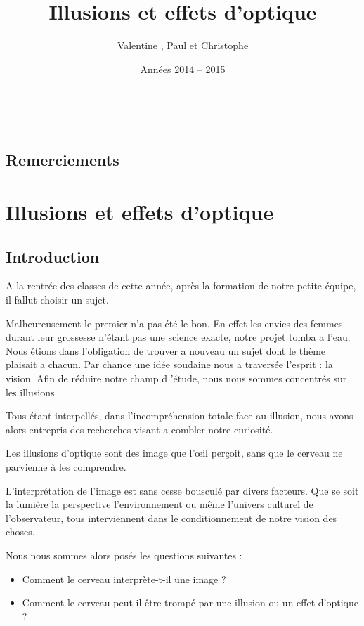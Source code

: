 \documentclass[a4paper, 12pt, onecolumn, openany]{report}
\title{\bsc{Thème : La Mesure} \\ \Huge{Illusions et effets d'optique}}
\author{Valentine \bsc{Sénégas}, Paul \bsc{Souchon} et Christophe \bsc{Néraud}}
\date{Années 2014 -- 2015}
\begin{document}
\renewcommand{\chaptername}{Partie}
\maketitle

\newpage
~
\newpage

\chapter*{Remerciements}
\pagestyle{fancy}

\renewcommand{\contentsname}{Sommaire} %
\renewcommand{\listfigurename}{Liste des images}
\tableofcontents

\part*{Illusions et effets d'optique}
\chapter*{Introduction}
	A la rentrée des classes de cette année, après la formation de notre petite équipe, il fallut choisir un sujet.
	
	Malheureusement le premier n'a pas été le bon. En effet les envies des femmes durant leur grossesse n'étant pas une science exacte, notre projet tomba a l'eau. Nous étions dans l'obligation de trouver a nouveau un sujet dont le thème plaisait a chacun. Par chance une idée soudaine nous a traversée l'esprit : la vision. Afin de réduire notre champ d 'étude, nous nous sommes concentrés sur les illusions.  
	
	Tous étant interpellés, dans l'incompréhension totale face au illusion, nous avons alors entrepris  des   recherches visant a combler notre curiosité.
	
	Les illusions d'optique sont des image que  l'œil perçoit, sans que le cerveau ne parvienne à les comprendre.
	
	L'interprétation de l'image est sans cesse bousculé par divers facteurs. Que se soit la lumière la perspective l'environnement ou même l'univers culturel de l'observateur, tous interviennent dans le conditionnement de notre vision des choses.
 
	Nous nous sommes alors posés les questions suivantes :
	
	\begin{itemize}
	\item Comment le cerveau interprète-t-il une image ? 	
	\item Comment le cerveau peut-il être trompé par une illusion ou un effet d'optique ?
	\end{itemize}
\end{document}
